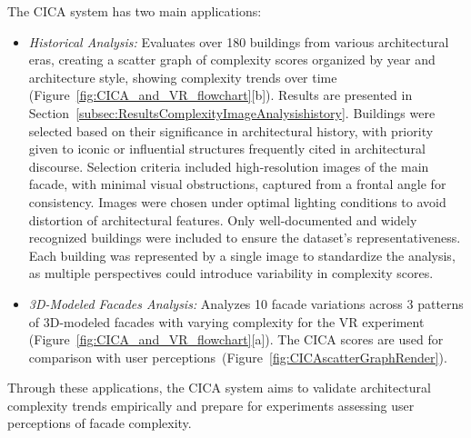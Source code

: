 The CICA system has two main applications:
\begin{itemize}
    \item \textit{Historical Analysis:} Evaluates over 180 buildings from various architectural eras, creating a scatter graph of complexity scores organized by year and architecture style, showing complexity trends over time (Figure~\ref{fig:CICA_and_VR_flowchart}[b]). Results are presented in Section~\ref{subsec:ResultsComplexityImageAnalysishistory}. Buildings were selected based on their significance in architectural history, with priority given to iconic or influential structures frequently cited in architectural discourse. Selection criteria included high-resolution images of the main facade, with minimal visual obstructions, captured from a frontal angle for consistency. Images were chosen under optimal lighting conditions to avoid distortion of architectural features. Only well-documented and widely recognized buildings were included to ensure the dataset's representativeness. Each building was represented by a single image to standardize the analysis, as multiple perspectives could introduce variability in complexity scores.

    \item \textit{3D-Modeled Facades Analysis:} Analyzes 10 facade variations across 3 patterns of 3D-modeled facades with varying complexity for the VR experiment (Figure~\ref{fig:CICA_and_VR_flowchart}[a]). The CICA scores are used for comparison with user perceptions~(Figure~\ref{fig:CICAscatterGraphRender}).
\end{itemize}

Through these applications, the CICA system aims to validate architectural complexity trends empirically and prepare for experiments assessing user perceptions of facade complexity.
